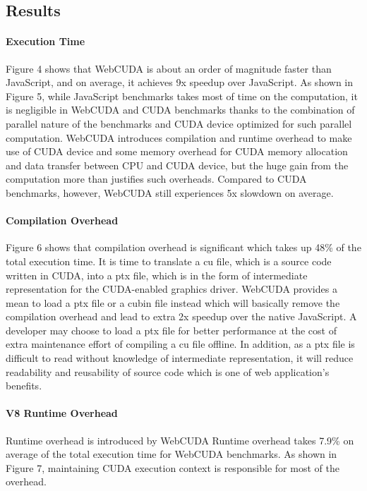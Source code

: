 \subsection{Results}

\paragraph{Execution Time}
Figure 4 shows that WebCUDA is about an order of magnitude faster than JavaScript, and on average, it achieves 9x speedup over JavaScript. As shown in Figure 5, while JavaScript benchmarks takes most of time on the computation, it is negligible in WebCUDA and CUDA benchmarks thanks to the combination of parallel nature of the benchmarks and CUDA device optimized for such parallel computation. WebCUDA introduces compilation and runtime overhead to make use of CUDA device and some memory overhead
for CUDA memory allocation and data transfer between CPU and CUDA device, but the huge gain from the computation more than justifies such overheads.
Compared to CUDA benchmarks, however, WebCUDA still experiences 5x slowdown on average.

\paragraph{Compilation Overhead}
Figure 6 shows that compilation overhead is significant which takes up 48\% of the total execution time. It is time to translate a cu file, which is a source code written in CUDA, into a ptx file, which is in the form of intermediate representation for the CUDA-enabled graphics driver. WebCUDA provides a mean to load a ptx file or a cubin file instead which will basically remove the compilation overhead and lead to extra 2x speedup over the native JavaScript. A developer may choose to load a ptx file for better performance at the cost of extra maintenance effort of compiling a cu file offline. In addition, as a ptx file is difficult to read without knowledge of intermediate representation, it will reduce readability and reusability of source code which is one of web application’s benefits.

\paragraph{V8 Runtime Overhead}
Runtime overhead is introduced by WebCUDA Runtime overhead takes 7.9\% on average of the total execution time for WebCUDA benchmarks. As shown in Figure 7, maintaining CUDA execution context is responsible for most of the overhead.

